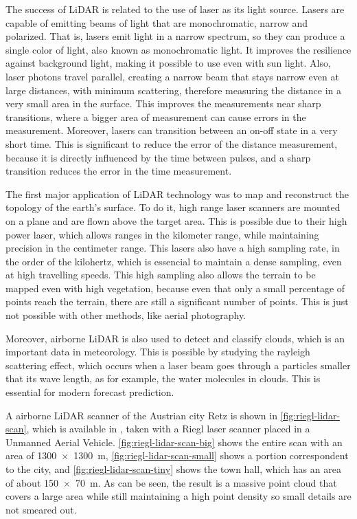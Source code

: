 The success of LiDAR is related to the use of laser as its light source. Lasers are capable of emitting beams of light that are monochromatic, narrow and polarized. That is, lasers emit light in a narrow spectrum, so they can produce a single color of light, also known as monochromatic light. It improves the resilience against background light, making it possible to use even with sun light. Also, laser photons travel parallel, creating a narrow beam that stays narrow even at large distances, with minimum scattering, therefore measuring the distance in a very small area in the surface. This improves the measurements near sharp transitions, where a bigger area of measurement can cause errors in the measurement. Moreover, lasers can transition between an on-off state in a very short time. This is significant to reduce the error of the distance measurement, because it is directly influenced by the time between pulses, and a sharp transition reduces the error in the time measurement. 

The first major application of LiDAR technology was to map and reconstruct the topology of the earth's surface. To do it, high range laser scanners are mounted on a plane and are flown above the target area. This is possible due to their high power laser, which allows ranges in the kilometer range, while maintaining precision in the centimeter range. This lasers also have a high sampling rate, in the order of the kilohertz, which is essencial to maintain a dense sampling, even at high travelling speeds. This high sampling also allows the terrain to be mapped even with high vegetation, because even that only a small percentage of points reach the terrain, there are still a significant number of points. This is just not possible with other methods, like aerial photography. 

Moreover, airborne LiDAR is also used to detect and classify clouds, which is an important data in meteorology. This is possible by studying the rayleigh scattering effect, which occurs when a laser beam goes through a particles smaller that its wave length, as for example, the water molecules in clouds.  This is essential for modern forecast prediction.

A airborne LiDAR scanner of the Austrian city Retz is shown in \cref{fig:riegl-lidar-scan}, which is available in \cite{potree-retz}, taken with a Riegl laser scanner placed in a Unmanned Aerial Vehicle. \cref{fig:riegl-lidar-scan-big} shows the entire scan with an area of \SI{1300 x 1300}{\meter}, \cref{fig:riegl-lidar-scan-small} shows a portion correspondent to the city, and \cref{fig:riegl-lidar-scan-tiny} shows the town hall, which has an area of about \SI{150 x 70}{\meter}. As can be seen, the result is a massive point cloud that covers a large area while still maintaining a high point density so small details are not smeared out. 

